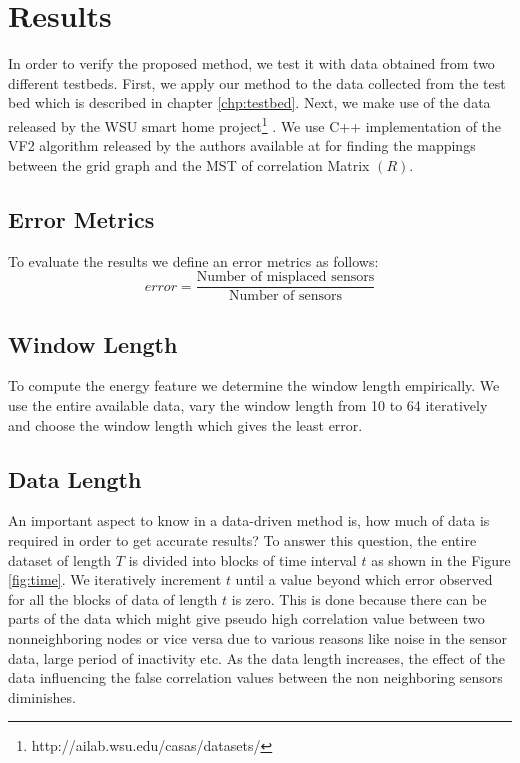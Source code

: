 \chapter{Results}
\label{chp:res}
In order to verify the proposed method, we test it with data obtained from two different testbeds. First, we apply our method to the data collected from the test bed which is described in chapter \ref{chp:testbed}. Next, we make use of the data released by the WSU smart home project\footnote{http://ailab.wsu.edu/casas/datasets/} \cite{cook2009assessing}. We use C++ implementation of the VF2 algorithm released by the authors available at \cite{vfLib} for finding the mappings between the grid graph and the MST of correlation Matrix $(R)$.
\section{Error Metrics }
To evaluate the results we define an error metrics as follows:\\
\begin{equation}
error=\frac{\text{Number of misplaced sensors}}{\text{Number of sensors}}
\end{equation}
\section{Window Length}
\label{sec:wl}
To compute the energy feature we determine the window length empirically. We use the entire available data, vary the window length from 10 to 64 iteratively and choose the window length which gives the least error.
\section{Data Length}
\label{sec:dataLength}
An important aspect to know in a data-driven method is, how much of data is required in order to get accurate results? To answer this question, the entire dataset of length $T$ is divided into blocks of time interval $t$ as shown in the Figure \ref{fig:time}. We iteratively increment $t$ until a value beyond which error observed for all the blocks of data of length $t$ is zero. 
This is done because there can be parts of the data which might give pseudo high correlation value between two nonneighboring nodes or vice versa due to various reasons like noise in the sensor data, large period of inactivity etc. As the data length increases, the effect of the data influencing the false correlation values between the non neighboring sensors diminishes.

